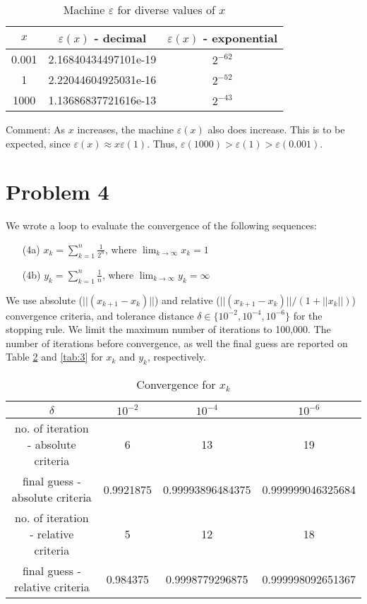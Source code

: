 \documentclass[11pt]{article}
\newcommand{\1}{\mathbbm{1}}
\begin{document}
	\begin{table}[h]
		\centering
		\begin{tabular}{ | c | c | c |}
			\hline
			\hline
			$x$ & $\varepsilon(x)$ - decimal & $\varepsilon(x)$ - exponential \\	
			\hline
			0.001 & 2.16840434497101e-19 & $2^{-62}$ \\ \hline
			1 & 2.22044604925031e-16 & $2^{-52}$ \\ \hline
			1000 & 1.13686837721616e-13 & $2^{-43}$ \\
			\hline
			\hline
		\end{tabular} 
		\caption{Machine $\varepsilon$ for diverse values of $x$}
		\label{tab:1}
	\end{table}
Comment: As $x$ increases, the machine $\varepsilon(x)$ also does increase. This is to be expected, since $\varepsilon(x)\approx x\varepsilon(1)$. Thus, $\varepsilon(1000)>\varepsilon(1)>\varepsilon(0.001)$.
	
\section*{Problem 4} 
We wrote a loop to evaluate the convergence of the following sequences: 
\begin{enumerate}
	\item[(4a)] $x_k=\sum_{k=1}^{n}\frac{1}{2^n}$, where $\lim_{k\rightarrow\infty}x_k=1$
	\item[(4b)] $y_k=\sum_{k=1}^{n}\frac{1}{n}$, where $\lim_{k\rightarrow\infty}y_k=\infty$
\end{enumerate}
We use absolute ($||(x_{k+1}-x_k)||$) and relative ($||(x_{k+1}-x_k)||/(1+||x_k||)$) convergence criteria, and tolerance distance $\delta\in\{10^{-2},10^{-4},10^{-6}\}$ for the stopping rule. We limit the maximum number of iterations to 100,000. The number of iterations before convergence, as well the final guess are reported on Table \ref{tab:2} and \ref{tab:3} for $x_k$ and $y_k$, respectively.

	\begin{table}[h]
	\centering
	\begin{tabular}{|c | c | c | c |}
		\hline
		\hline
		$\delta	$							&$10^{-2}$ 			&$10^{-4}$ 			&$10^{-6}$          \\
		\hline
		no. of iteration - absolute criteria&6					&13					&19               \\
		final guess - absolute criteria		&0.9921875	&0.99993896484375	&0.999999046325684\\
		no. of iteration - relative criteria&5					&12					&18               \\
		final guess - relative criteria		&0.984375	&0.9998779296875	&0.999998092651367\\
		\hline
		\hline
	\end{tabular} 
	\caption{Convergence for $x_k$}
	\label{tab:2}
\end{table}
\end{document}
